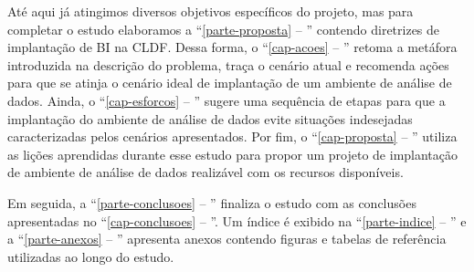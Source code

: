     Até aqui já atingimos diversos objetivos específicos do projeto, mas para completar o estudo elaboramos a ``\autoref{parte-proposta} -- '' contendo diretrizes de implantação de BI na CLDF. Dessa forma, o ``\autoref{cap-acoes} -- '' retoma a metáfora introduzida na descrição do problema, traça o cenário atual e recomenda ações para que se atinja o cenário ideal de implantação de um ambiente de análise de dados. Ainda, o ``\autoref{cap-esforcos} -- '' sugere uma sequência de etapas para que a implantação do ambiente de análise de dados evite situações indesejadas caracterizadas pelos cenários apresentados. Por fim, o ``\autoref{cap-proposta} -- '' utiliza as lições aprendidas durante esse estudo para propor um projeto de implantação de ambiente de análise de dados realizável com os recursos disponíveis.
    
    Em seguida, a ``\autoref{parte-conclusoes} -- '' finaliza o estudo com as conclusões apresentadas no ``\autoref{cap-conclusoes} -- ''. Um índice é exibido na ``\autoref{parte-indice} -- '' e a ``\autoref{parte-anexos} -- '' apresenta anexos contendo figuras e tabelas de referência utilizadas ao longo do estudo. 























